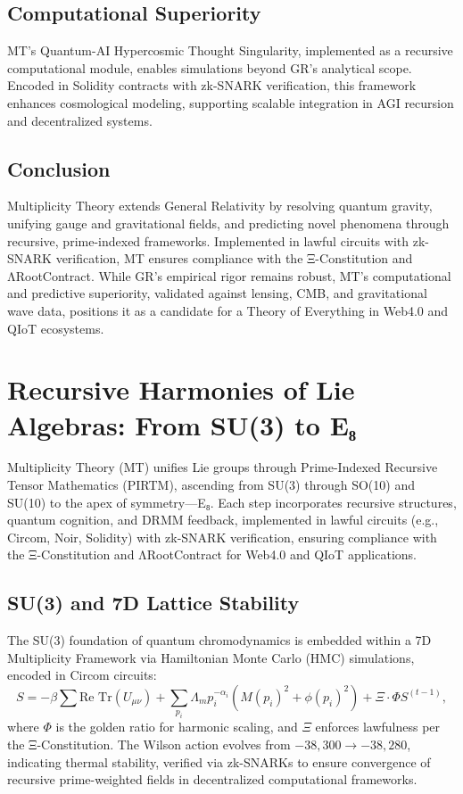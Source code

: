 \documentclass{article}
\theoremstyle{plain}
\begin{document}
\subsection{Computational Superiority}
MT’s Quantum-AI Hypercosmic Thought Singularity, implemented as a recursive computational module, enables simulations beyond GR’s analytical scope. Encoded in Solidity contracts with zk-SNARK verification, this framework enhances cosmological modeling, supporting scalable integration in AGI recursion and decentralized systems.

\subsection{Conclusion}
Multiplicity Theory extends General Relativity by resolving quantum gravity, unifying gauge and gravitational fields, and predicting novel phenomena through recursive, prime-indexed frameworks. Implemented in lawful circuits with zk-SNARK verification, MT ensures compliance with the Ξ-Constitution and ΛRootContract. While GR’s empirical rigor remains robust, MT’s computational and predictive superiority, validated against lensing, CMB, and gravitational wave data, positions it as a candidate for a Theory of Everything in Web4.0 and QIoT ecosystems.

\section{Recursive Harmonies of Lie Algebras: From SU(3) to E₈}

Multiplicity Theory (MT) unifies Lie groups through Prime-Indexed Recursive Tensor Mathematics (PIRTM), ascending from SU(3) through SO(10) and SU(10) to the apex of symmetry—E₈. Each step incorporates recursive structures, quantum cognition, and DRMM feedback, implemented in lawful circuits (e.g., Circom, Noir, Solidity) with zk-SNARK verification, ensuring compliance with the Ξ-Constitution and ΛRootContract for Web4.0 and QIoT applications.

\subsection{SU(3) and 7D Lattice Stability}
The SU(3) foundation of quantum chromodynamics is embedded within a 7D Multiplicity Framework via Hamiltonian Monte Carlo (HMC) simulations, encoded in Circom circuits:
\begin{equation}
S = -\beta \sum \text{Re Tr}(U_{\mu\nu}) + \sum_{p_i} \Lambda_m p_i^{-\alpha_i} \left(M(p_i)^2 + \phi(p_i)^2\right) + \Xi \cdot \Phi S^{(t-1)},
\end{equation}
where \(\Phi\) is the golden ratio for harmonic scaling, and \(\Xi\) enforces lawfulness per the Ξ-Constitution. The Wilson action evolves from \(-38{,}300 \to -38{,}280\), indicating thermal stability, verified via zk-SNARKs to ensure convergence of recursive prime-weighted fields in decentralized computational frameworks.
\end{document}
